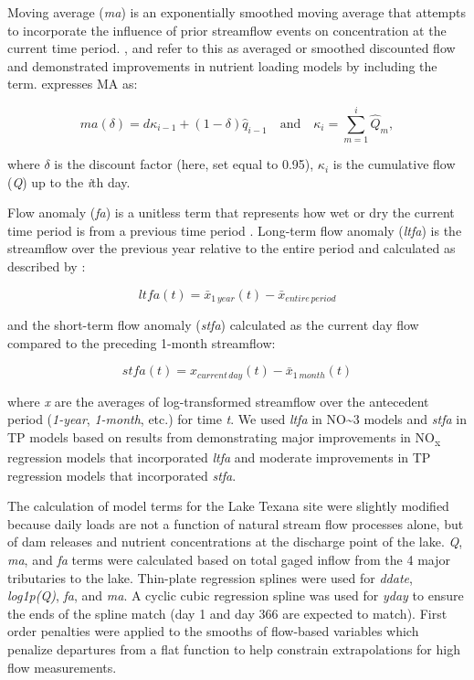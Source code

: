 \documentclass[water,article,submit,oneauthor]{Definitions/mdpi}
\begin{document}
Moving average (\emph{ma}) is an exponentially smoothed moving average
that attempts to incorporate the influence of prior streamflow events on
concentration at the current time period.
\citet{wangLoadEstimationUncertainties2011},
\citet{kuhnert_quantifying_2012} and \citet{zhang_improving_2017} refer
to this as averaged or smoothed discounted flow and demonstrated
improvements in nutrient loading models by including the term.
\citet{kuhnert_quantifying_2012} expresses MA as:

\begin{equation}\label{eq:2}
ma(\delta) = d{\kappa_{i-1}}+(1-\delta)\hat{q}_{i-1}\quad\text{and}\quad \kappa_{i}=\sum_{m=1}^{i}\hat{Q}_m,
\end{equation}

where \(\delta\) is the discount factor (here, set equal to 0.95),
\(\kappa_i\) is the cumulative flow (\emph{Q}) up to the \emph{i}th day.

Flow anomaly (\emph{fa}) is a unitless term that represents how wet or
dry the current time period is from a previous time period
\citep{vecchia_trends_2009, zhang_improving_2017}. Long-term flow
anomaly (\emph{ltfa}) is the streamflow over the previous year relative
to the entire period and calculated as described by
\citet{zhang_improving_2017}:

\begin{equation}\label{eq:3}
ltfa(t) = \bar{x}_{1\,year}(t) - \bar{x}_{entire\,period} 
\end{equation}

and the short-term flow anomaly (\emph{stfa}) calculated as the current
day flow compared to the preceding 1-month streamflow:

\begin{equation}\label{eq:4}
stfa(t) = x_{current\,day}(t) - \bar{x}_{1\,month}(t) 
\end{equation}

where \emph{x} are the averages of log-transformed streamflow over the
antecedent period (\emph{1-year}, \emph{1-month}, etc.) for time
\emph{t}. We used \emph{ltfa} in NO\textasciitilde3 models and
\emph{stfa} in TP models based on results from
\citet{zhang_improving_2017} demonstrating major improvements in
NO\textsubscript{x} regression models that incorporated \emph{ltfa} and
moderate improvements in TP regression models that incorporated
\emph{stfa}.

The calculation of model terms for the Lake Texana site were slightly
modified because daily loads are not a function of natural stream flow
processes alone, but of dam releases and nutrient concentrations at the
discharge point of the lake. \emph{Q}, \emph{ma}, and \emph{fa} terms
were calculated based on total gaged inflow from the 4 major tributaries
to the lake. Thin-plate regression splines were used for \emph{ddate},
\emph{log1p(Q)}, \emph{fa}, and \emph{ma}. A cyclic cubic regression
spline was used for \emph{yday} to ensure the ends of the spline match
(day 1 and day 366 are expected to match). First order penalties were
applied to the smooths of flow-based variables which penalize departures
from a flat function to help constrain extrapolations for high flow
measurements.
\end{document}
